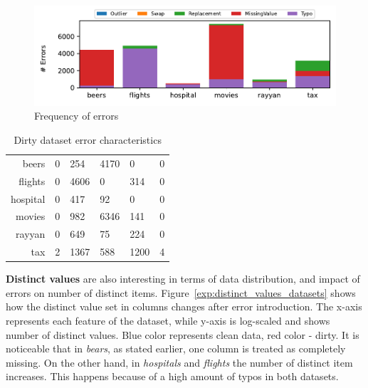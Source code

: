 \begin{figure}[!t]
    \centering
    \includegraphics[width=\textwidth]{figures/plot/error_percent/errors.pdf}
    \caption{Frequency of errors}
    \label{exp:errors_count}
\end{figure}

\begin{table}[!t]
\centering
\caption{\label{tab:dirty_num_errors}Dirty dataset error characteristics}
\begin{tabular}{r|K|K|K|K|K}
\toprule
                     &  &  &              &               &    \\ \midrule
beers                & 0        & 254   & 4170           & 0                & 0       \\
flights              & 0        & 4606  & 0              & 314              & 0       \\
hospital             & 0        & 417   & 92             & 0                & 0       \\
movies               & 0        & 982   & 6346           & 141              & 0       \\
rayyan               & 0        & 649   & 75             & 224              & 0       \\
tax                  & 2        & 1367  & 588            & 1200             & 4       \\ \bottomrule
\end{tabular}
\end{table}

\textbf{Distinct values} are also interesting in terms of data distribution, and impact of errors on number of distinct items.
Figure~\ref{exp:distinct_values_datasets} shows how the distinct value set in columns changes after error introduction. 
The x-axis represents each feature of the dataset, while y-axis is log-scaled and shows number of distinct values. 
Blue color represents clean data, red color - dirty.
It is noticeable that in \textit{bears}, as stated earlier, one column is treated as completely missing.
On the other hand, in \textit{hospitals} and \textit{flights} the number of distinct item increases.
This happens because of a high amount of typos in both datasets.

